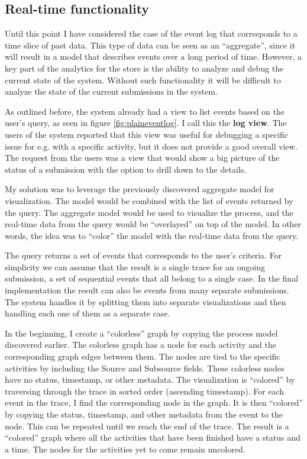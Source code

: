 \subsection{Real-time functionality}

Until this point I have considered the case of the event log that corresponds to a time slice of past data.
This type of data can be seen as an ``aggregate'', since it will result in a model that describes events over a long period of time.
However, a key part of the analytics for the store is the ability to analyze and debug the current state of the system.
Without such functionality it will be difficult to analyze the state of the current submissions in the system.

As outlined before, the system already had a view to list events based on the user's query, as seen in figure \ref{fig:plaineventlog}.
I call this the \textbf{log view}.
The users of the system reported that this view was useful for debugging a specific issue for e.g. with a specific activity, but it does not provide a good overall view.
The request from the users was a view that would show a big picture of the status of a submission with the option to drill down to the details.

My solution was to leverage the previously discovered aggregate model for visualization.
The model would be combined with the list of events returned by the query.
The aggregate model would be used to visualize the process, and the real-time data from the query would be ``overlayed'' on top of the model.
In other words, the idea was to ``color'' the model with the real-time data from the query.

The query returns a set of events that corresponds to the user's criteria.
For simplicity we can assume that the result is a single trace for an ongoing submission,
a set of sequential events that all belong to a single case.
In the final implementation the result can also be events from many separate submissions.
The system handles it by splitting them into separate visualizations and then handling each one of them as a separate case.

In the beginning, I create a ``colorless'' graph by copying the process model discovered earlier.
The colorless graph has a node for each activity and the corresponding graph edges between them.
The nodes are tied to the specific activities by including the Source and Subsource fields. 
These colorless nodes have no status, timestamp, or other metadata.
The visualization is ``colored'' by traversing through the trace in sorted order (ascending timestamp).
For each event in the trace, I find the corresponding node in the graph.
It is then ``colored'' by copying the status, timestamp, and other metadata from the event to the node.
This can be repeated until we reach the end of the trace.
The result is a ``colored'' graph where all the activities that have been finished have a status and a time.
The nodes for the activities yet to come remain uncolored.

